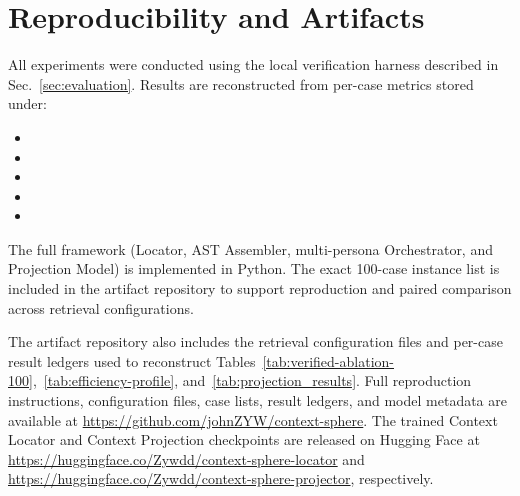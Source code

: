 \section{Reproducibility and Artifacts}
\label{sec:reproducibility}

All experiments were conducted using the local verification harness described in Sec.~\ref{sec:evaluation}. Results are reconstructed from per-case metrics stored under:
\begin{itemize}
    \item {}
    \item {}
    \item {}
    \item {}
    \item {}
\end{itemize}

The full framework (Locator, AST Assembler, multi-persona Orchestrator, and Projection Model) is implemented in Python. The exact 100-case instance list is included in the artifact repository to support reproduction and paired comparison across retrieval configurations.

The artifact repository also includes the retrieval configuration files and per-case result ledgers used to reconstruct Tables~\ref{tab:verified-ablation-100},~\ref{tab:efficiency-profile}, and~\ref{tab:projection_results}. Full reproduction instructions, configuration files, case lists, result ledgers, and model metadata are available at \url{https://github.com/johnZYW/context-sphere}. The trained Context Locator and Context Projection checkpoints are released on Hugging Face at \url{https://huggingface.co/Zywdd/context-sphere-locator} and \url{https://huggingface.co/Zywdd/context-sphere-projector}, respectively.

